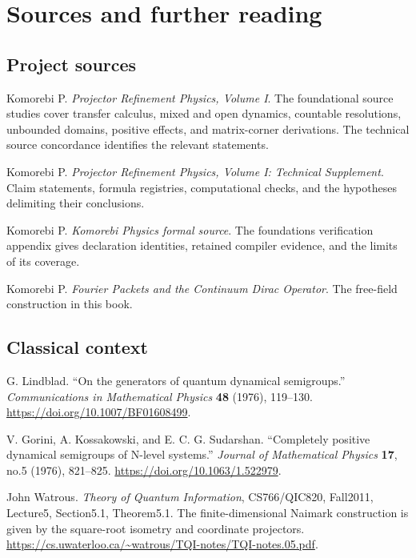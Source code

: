\clearpage
\section*{Sources and further reading}
\subsection*{Project sources}
\begin{enumerate}[label={[P\arabic*]},leftmargin=2.5em]
\item Komorebi P. \emph{Projector Refinement Physics, Volume I}. The foundational source studies cover transfer calculus, mixed and open dynamics, countable resolutions, unbounded domains, positive effects, and matrix-corner derivations. The technical source concordance identifies the relevant statements.
\item Komorebi P. \emph{Projector Refinement Physics, Volume I: Technical Supplement}. Claim statements, formula registries, computational checks, and the hypotheses delimiting their conclusions.
\item Komorebi P. \emph{Komorebi Physics formal source}. The foundations verification appendix gives declaration identities, retained compiler evidence, and the limits of its coverage.
\item Komorebi P. \emph{Fourier Packets and the Continuum Dirac Operator}. The free-field construction in this book.
\end{enumerate}

\subsection*{Classical context}
\begin{enumerate}[label={[C\arabic*]},leftmargin=2.5em]
\item G. Lindblad. ``On the generators of quantum dynamical semigroups.'' \emph{Communications in Mathematical Physics} \textbf{48} (1976), 119--130. \url{https://doi.org/10.1007/BF01608499}.
\item V. Gorini, A. Kossakowski, and E. C. G. Sudarshan. ``Completely positive dynamical semigroups of N-level systems.'' \emph{Journal of Mathematical Physics} \textbf{17}, no.5 (1976), 821--825. \url{https://doi.org/10.1063/1.522979}.
\item John Watrous. \emph{Theory of Quantum Information}, CS766/QIC820, Fall2011, Lecture5, Section5.1, Theorem5.1. The finite-dimensional Naimark construction is given by the square-root isometry and coordinate projectors. \url{https://cs.uwaterloo.ca/~watrous/TQI-notes/TQI-notes.05.pdf}.
\end{enumerate}

